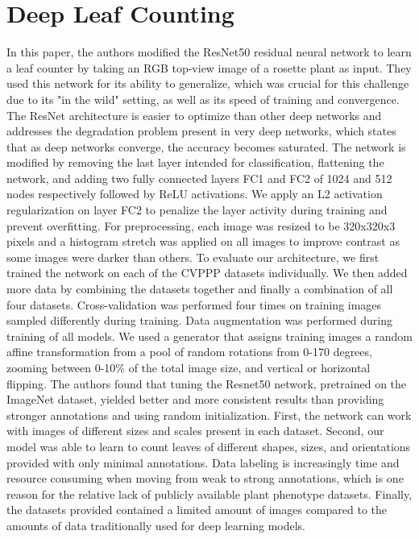 \section{Deep Leaf Counting}
In this paper, the authors modified the ResNet50 residual neural network to learn a leaf counter by taking an RGB top-view image of a rosette plant as input.
They used this network for its ability to generalize, which was crucial for this challenge due to its "in the wild" setting, as well as its speed of training
and convergence. The ResNet architecture is easier to optimize than other deep networks and addresses the degradation problem present in very deep networks,
which states that as deep networks converge, the accuracy becomes saturated. The network is modified by removing the last layer intended for classification,
flattening the network, and adding two fully connected layers FC1 and FC2 of 1024 and 512 nodes respectively followed by ReLU activations. We apply an L2 activation
regularization on layer FC2 to penalize the layer activity during training and prevent overfitting. For preprocessing, each image was resized to be 320x320x3 pixels
and a histogram stretch was applied on all images to improve contrast as some images were darker than others. To evaluate our architecture, we first trained the network
on each of the CVPPP datasets individually. We then added more data by combining the datasets together and finally a combination of all four datasets.
Cross-validation was performed four times on training images sampled differently during training. Data augmentation was performed during training of all models.
We used a generator that assigns training images a random affine transformation from a pool of random rotations from 0-170 degrees, zooming between 0-10\% of the
total image size, and vertical or horizontal flipping. The authors found that tuning the Resnet50 network, pretrained on the ImageNet dataset, yielded better and
more consistent results than providing stronger annotations and using random initialization. First, the network can work with images of different sizes and scales
present in each dataset. Second, our model was able to learn to count leaves of different shapes, sizes, and orientations provided with only minimal annotations. 
Data labeling is increasingly time and resource consuming when moving from weak to strong annotations, which is one reason for the relative lack of publicly available
plant phenotype datasets. Finally, the datasets provided contained a limited amount of images compared to the amounts of data traditionally used for deep learning models.
